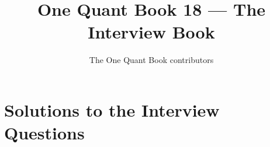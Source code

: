 \documentclass[11pt,a4paper,twoside,openany]{book}
\title{One Quant Book 18 --- The Interview Book}
\author{The One Quant Book contributors}
\date{\bookdate}
\renewcommand{\omsolutionspart}{Solutions to the Interview Questions}
\begin{document}
\frontmatter



\tableofcontents

\mainmatter


\appendix
\part{\omsolutionspart}


\backmatter
\printindex
\end{document}
